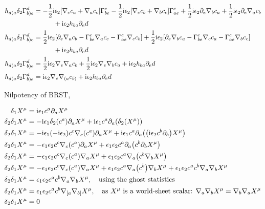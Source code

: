 \begin{align*}
    h_{d(a}\delta_2\Gamma^d_{b)e}&=-\frac12\textnormal{i}\epsilon_2\qty[\nabla_{c}c_{a}+\nabla_{a}c_{c}]\Gamma^c_{be}-\frac12\textnormal{i}\epsilon_2\qty[\nabla_{c}c_{b}+\nabla_{b}c_{c}]\Gamma^c_{ae}+\frac12\textnormal{i}\epsilon_2\partial_e\nabla_{b}c_{a}+\frac12\textnormal{i}\epsilon_2\partial_e\nabla_{a}c_{b}\\
    &\quad\quad\quad+\textnormal{i}\epsilon_2h_{ba}\partial_ed\\
    h_{d(a}\delta_2\Gamma^d_{b)e}&=\frac12\textnormal{i}\epsilon_2\qty[\partial_e\nabla_{a}c_{b}-\Gamma^c_{be}\nabla_{a}c_{c}-\Gamma^c_{ae}\nabla_{c}c_{b}]+\frac12\textnormal{i}\epsilon_2\qty[\partial_e\nabla_{b}c_{a}-\Gamma^c_{be}\nabla_{c}c_{a}-\Gamma^c_{ae}\nabla_{b}c_{c}]\\
    &\quad\quad\quad+\textnormal{i}\epsilon_2h_{ba}\partial_ed\\
    h_{d(a}\delta_2\Gamma^d_{b)e}&=\frac12\textnormal{i}\epsilon_2\nabla_e\nabla_{a}c_{b}+\frac12\textnormal{i}\epsilon_2\nabla_e\nabla_{b}c_{a}+\textnormal{i}\epsilon_2h_{ba}\partial_ed\\
    h_{d(a}\delta_2\Gamma^d_{b)e}&=\textnormal{i}\epsilon_2\nabla_e\nabla_{(a}c_{b)}+\textnormal{i}\epsilon_2h_{ba}\partial_ed
\end{align*}

Nilpotency of BRST,

\begin{align*}
    \delta_1X^\mu&=\textnormal{i}\epsilon_1c^a\partial_a X^\mu\\
    \delta_2\delta_1X^\mu&=-\textnormal{i}\epsilon_1\delta_2\qty(c^a)\partial_a X^\mu+\textnormal{i}\epsilon_1c^a\partial_a\qty( \delta_2\qty(X^\mu))\\
    \delta_2\delta_1X^\mu&=-\textnormal{i}\epsilon_1\qty(-\textnormal{i}\epsilon_2)c^c\nabla_c\qty(c^a)\partial_a X^\mu+\textnormal{i}\epsilon_1c^a\partial_a \qty(\qty(\textnormal{i}\epsilon_2c^b\partial_b)X^\mu)\\
    \delta_2\delta_1X^\mu&=-\epsilon_1\epsilon_2c^c\nabla_c\qty(c^a)\partial_a X^\mu+\epsilon_1\epsilon_2c^a\partial_a \qty(c^b\partial_b X^\mu)\\
    \delta_2\delta_1X^\mu&=-\epsilon_1\epsilon_2c^c\nabla_c\qty(c^a)\nabla_a X^\mu+\epsilon_1\epsilon_2c^a\nabla_a \qty(c^b\nabla_b X^\mu)\\
    \delta_2\delta_1X^\mu&=-\epsilon_1\epsilon_2c^c\nabla_c\qty(c^a)\nabla_a X^\mu+\epsilon_1\epsilon_2c^a\nabla_a \qty(c^b)\nabla_b X^\mu+\epsilon_1\epsilon_2c^ac^b\nabla_a\nabla_b X^\mu\\
    \delta_2\delta_1X^\mu&=\epsilon_1\epsilon_2c^ac^b\nabla_a\nabla_b X^\mu, \ \ \ \textnormal{using the ghost statistics}\\
    \delta_2\delta_1X^\mu&=\epsilon_1\epsilon_2c^ac^b\nabla_{[a}\nabla_{b]} X^\mu,\ \ \ \textnormal{as $X^\mu$ is a world-sheet scalar: }\nabla_a\nabla_b X^\mu=\nabla_b\nabla_a X^\mu\\
    \delta_2\delta_1X^\mu&=0
\end{align*}

